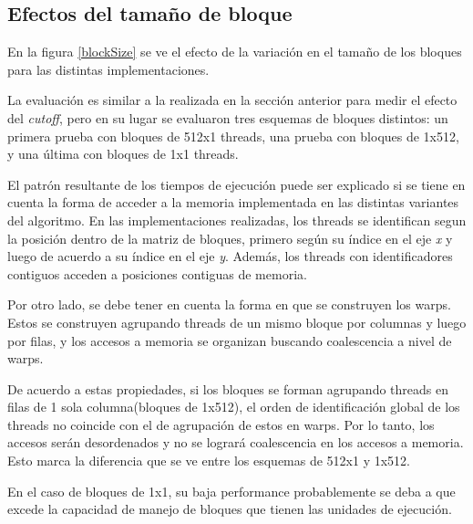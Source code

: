 \subsection{Efectos del tamaño de bloque}

En la figura \ref{blockSize} se ve el efecto de la variación en el tamaño de los bloques para las distintas implementaciones.

La evaluación es similar a la realizada en la sección anterior para medir el efecto del \textit{cutoff}, pero en su lugar se evaluaron tres esquemas de bloques distintos: 
un primera prueba con bloques de 512x1 threads, una prueba con bloques de 1x512, y una última con bloques de 1x1 threads.

El patrón resultante de los tiempos de ejecución puede ser explicado si se tiene en cuenta la forma de acceder a la memoria implementada en las distintas variantes del algoritmo.
En las implementaciones realizadas, los threads se identifican segun la posición dentro de la matriz de bloques, primero según su índice en el eje \textit{x} y luego de acuerdo a su índice en el eje \textit{y}.
Además, los threads con identificadores contiguos acceden a posiciones contiguas de memoria. 

Por otro lado, se debe tener en cuenta la forma en que se construyen los warps. Estos se construyen agrupando threads de un mismo bloque por columnas y luego por filas, y los accesos a memoria se organizan buscando coalescencia a nivel de warps.


De acuerdo a estas propiedades, si los bloques se forman agrupando threads en filas de 1 sola columna(bloques de 1x512), el orden de identificación global de los threads no coincide con el de agrupación de estos en warps. 
Por lo tanto, los accesos serán desordenados y no se logrará coalescencia en los accesos a memoria.
Esto marca la diferencia que se ve entre los esquemas de 512x1 y 1x512.


En el caso de bloques de 1x1, su baja performance probablemente se deba a que excede la capacidad de manejo de bloques que tienen las unidades de ejecución. 


